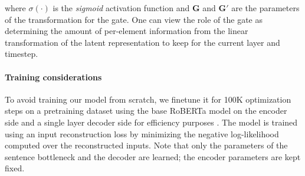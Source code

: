 \noindent where $\sigma(\cdot)$ is the \textit{sigmoid} activation function and $\mathbf{G}$ and $\mathbf{G}'$
are the parameters of the transformation for the gate. %
One can view the role of the gate as determining the amount of per-element information from the linear transformation of the latent representation to keep for the current layer and timestep.

\paragraph{Training considerations} To avoid training our model from scratch, we finetune it for 100K optimization  steps on a pretraining dataset using the base RoBERTa model \cite{liu2019RoBERTa} on the encoder side and a single layer 
decoder side for efficiency purposes \citep{kasai2021deep}. The model is trained using an input reconstruction loss by minimizing the negative log-likelihood computed over the reconstructed inputs. Note that only the parameters of the sentence bottleneck and the decoder are learned; the encoder parameters are kept fixed.


